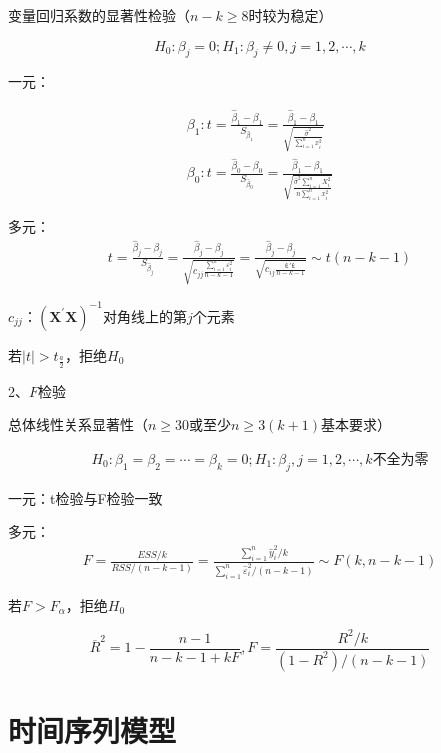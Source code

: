 \documentclass[12pt]{book}
\begin{document}
变量回归系数的显著性检验（$n-k\geq 8$时较为稳定）

$$
H_0:\beta_j=0; H_1:\beta_j\neq 0, j=1,2,\cdots,k
$$

一元：

\begin{gather*}
\beta_1:
t
=\frac{\hat{\beta}_1-\beta_1}{S_{\hat{\beta}_1}} 
=\frac{\hat{\beta}_1-\beta_1}{\sqrt{\frac{\hat{\sigma}^2}{\sum_{i=1}^{n}{x_i^2}}}}\\
\beta_0: 
t
=\frac{\hat{\beta}_0-\beta_0}{S_{\hat{\beta}_0}} 
=\frac{\hat{\beta}_1-\beta_1}{\sqrt{\frac{\hat{\sigma}^2\sum_{i=1}^{n}{X_i^2}}{n \sum_{i=1}^{n}{x_i^2}}}}
\end{gather*}


多元：
\begin{gather*}
    t=\frac{\hat{\beta}_j-\beta_j}{S_{\hat{\beta}_j}} =\frac{\hat{\beta}_j-\beta_j}{\sqrt{c_{jj}\frac{\sum_{i=1}^{n}{\varepsilon_i^2}}{n -k-1}}} =\frac{\hat{\beta}_j-\beta_j}{\sqrt{c_{ij}\frac{\bm{\hat{\varepsilon}}' \bm{ \hat{\varepsilon}}}{n -k-1}}} \sim t(n-k-1)
\end{gather*}


$c_{jj}$：$\left(\bm{X}^\prime\bm{X}\right)^{-1}$对角线上的第$j$个元素

若$\left|t\right|>t_{\frac{a}{2}}$，拒绝$H_0$

2、$F$检验

总体线性关系显著性（$n\geq 30$或至少$n\geq3\left(k+1\right)$基本要求）

\begin{gather*}
    H_0:\beta_1=\beta_2=\cdots=\beta_k=0;H_1:\beta_{j}, j=1,2,\cdots,k\text{不全为零}
\end{gather*}


一元：t检验与F检验一致

多元：
\begin{gather*}
F=\frac{ESS/k}{RSS/(n-k-1)} = \frac{\sum_{i=1}^{n}{\hat{y}_i^2/k}}{\sum_{i=1}^{n}{\hat{\varepsilon}_i^2/(n-k-1)}}\sim F(k,n-k-1)
\end{gather*}


若$F>F_\alpha$，拒绝$H_0$

$$
{\overline{R}}^2=1-\frac{n-1}{n-k-1+kF}, F=\frac{R^2/k}{(1-R^2)/(n-k-1)}
$$












\section{时间序列模型}
\end{document}
